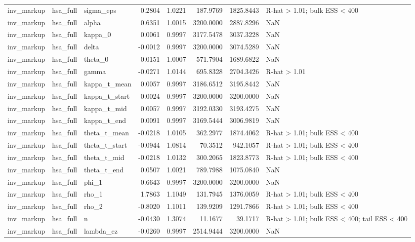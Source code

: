 \begin{tabular}{lllrrrrl}
inv\_markup & hsa\_full & sigma\_eps & 0.2804 & 1.0221 & 187.9769 & 1825.8443 & R-hat > 1.01; bulk ESS < 400 \\
inv\_markup & hsa\_full & alpha & 0.6351 & 1.0015 & 3200.0000 & 2887.8296 & NaN \\
inv\_markup & hsa\_full & kappa\_0 & 0.0061 & 0.9997 & 3177.5478 & 3037.3228 & NaN \\
inv\_markup & hsa\_full & delta & -0.0012 & 0.9997 & 3200.0000 & 3074.5289 & NaN \\
inv\_markup & hsa\_full & theta\_0 & -0.0151 & 1.0007 & 571.7904 & 1689.6822 & NaN \\
inv\_markup & hsa\_full & gamma & -0.0271 & 1.0144 & 695.8328 & 2704.3426 & R-hat > 1.01 \\
inv\_markup & hsa\_full & kappa\_t\_mean & 0.0057 & 0.9997 & 3186.6512 & 3195.8442 & NaN \\
inv\_markup & hsa\_full & kappa\_t\_start & 0.0024 & 0.9997 & 3200.0000 & 3200.0000 & NaN \\
inv\_markup & hsa\_full & kappa\_t\_mid & 0.0057 & 0.9997 & 3192.0330 & 3193.4275 & NaN \\
inv\_markup & hsa\_full & kappa\_t\_end & 0.0091 & 0.9997 & 3169.5444 & 3006.9819 & NaN \\
inv\_markup & hsa\_full & theta\_t\_mean & -0.0218 & 1.0105 & 362.2977 & 1874.4062 & R-hat > 1.01; bulk ESS < 400 \\
inv\_markup & hsa\_full & theta\_t\_start & -0.0944 & 1.0814 & 70.3512 & 942.1057 & R-hat > 1.01; bulk ESS < 400 \\
inv\_markup & hsa\_full & theta\_t\_mid & -0.0218 & 1.0132 & 300.2065 & 1823.8773 & R-hat > 1.01; bulk ESS < 400 \\
inv\_markup & hsa\_full & theta\_t\_end & 0.0507 & 1.0021 & 789.7988 & 1075.0840 & NaN \\
inv\_markup & hsa\_full & phi\_1 & 0.6643 & 0.9997 & 3200.0000 & 3200.0000 & NaN \\
inv\_markup & hsa\_full & rho\_1 & 1.7863 & 1.1049 & 131.7945 & 1376.0059 & R-hat > 1.01; bulk ESS < 400 \\
inv\_markup & hsa\_full & rho\_2 & -0.8020 & 1.1011 & 139.9209 & 1291.7866 & R-hat > 1.01; bulk ESS < 400 \\
inv\_markup & hsa\_full & n & -0.0430 & 1.3074 & 11.1677 & 39.1717 & R-hat > 1.01; bulk ESS < 400; tail ESS < 400 \\
inv\_markup & hsa\_full & lambda\_ez & -0.0260 & 0.9997 & 2514.9444 & 3200.0000 & NaN \\

\end{tabular}
